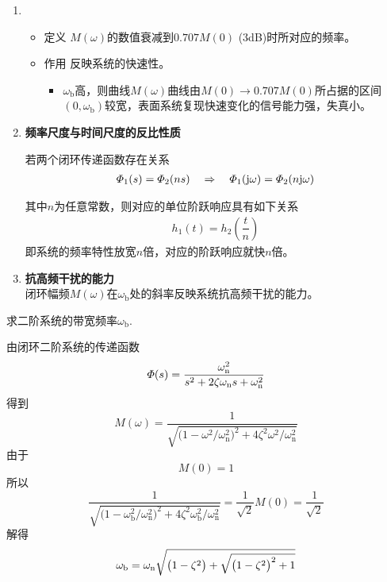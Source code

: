 \begin{enumerate}[1. ]
		\item {}
		\begin{itemize}
			\item 定义 \quad $M(\omega)$的数值衰减到$0.707M(0)\,\,$(3dB)时所对应的频率。
			\item 作用 \quad 反映系统的快速性。
			\begin{itemize}
				\item $\omega_{\text{b}}$高，则曲线$M(\omega)$曲线由$M(0)\to 0.707 M(0)$所占据的区间$(0, \omega_{\text{b}})$较宽，表面系统复现快速变化的信号能力强，失真小。
			\end{itemize}
		\end{itemize}
		
		\item \textbf{频率尺度与时间尺度的反比性质}
				
			\theorem[相似定理]
			若两个闭环传递函数存在关系
			\vspace*{-1em}
			\begin{align}
				\varPhi_1(s) = \varPhi_2(n s) \quad \Rightarrow \quad \varPhi_1(\text{j} \omega) = \varPhi_2(n \text{j} \omega)
			\end{align}
			\vspace*{-3em}
			
			其中$n$为任意常数，则对应的单位阶跃响应具有如下关系
			\begin{align}
				h_1(t) = h_2 \left(\dfrac{t}{n}\right)
			\end{align}
			即系统的频率特性放宽$n$倍，对应的阶跃响应就快$n$倍。
				
				
				
		\item \textbf{抗高频干扰的能力}	\\
		\hspace*{2em} 闭环幅频$M(\omega)$在$\omega_{\text{b}}$处的斜率反映系统抗高频干扰的能力。
\end{enumerate}
\examples 求二阶系统的带宽频率$\omega_{\text{b}}$.

\solve 由闭环二阶系统的传递函数
\[
\varPhi(s) =  \dfrac{\omega_{\rm{n}}^2}{s^2 + 2 \zeta \omega_{\rm{n}} s + \omega_{\rm{n}}^2}
\]
得到
\[
M(\omega) = \dfrac{1}{\sqrt{ \big(1 - \omega^2 / \omega_{\text{n}}^2\big)^2+ 4 \zeta^2 \omega^2 / \omega_{\text{n}}^2}} 
\]
由于
\[
	M(0) = 1
\]
所以
\[
\dfrac{1}{\sqrt{ \big(1 - \omega_{\text{b}}^2 / \omega_{\text{n}}^2\big)^2+ 4 \zeta^2 \omega_{\text{b}}^2 / \omega_{\text{n}}^2}}  = \dfrac{1}{\sqrt{2}}M(0) = \dfrac{1}{\sqrt{2}}
\]
解得
\begin{align}
	\omega_{\text{b}} = \omega_{{\rm{n}}}\sqrt{\big(1 - \zeta^2\big) + \sqrt{\big(1 - \zeta^2\big)^2 + 1}}
\end{align}

